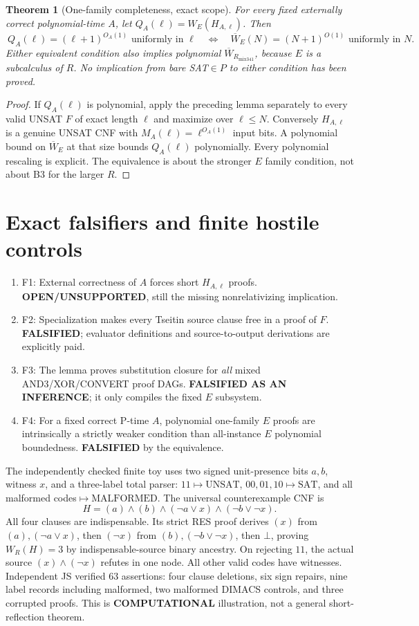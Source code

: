 \documentclass[11pt]{article}
\newtheorem{theorem}{Theorem}
\begin{document}
\begin{theorem}[One-family completeness, exact scope]
For \emph{every fixed externally correct polynomial-time} $A$, let $Q_A(\ell)=W_E(H_{A,\ell})$. Then
\[
\boxed{\ Q_A(\ell)=(\ell+1)^{O_A(1)}\text{ uniformly in }\ell
\quad\Longleftrightarrow\quad
\overline W_E(N)=(N+1)^{O(1)}\text{ uniformly in }N.\ }
\]
Either equivalent condition also implies polynomial $\overline W_{R_{\mathrm{mix341}}}$, because $E$ is a subcalculus of $R$. No implication from bare SAT$\in P$ to either condition has been proved.
\end{theorem}
\begin{proof}
If $Q_A(\ell)$ is polynomial, apply the preceding lemma separately to every valid UNSAT $F$ of exact length $\ell$ and maximize over $\ell\le N$. Conversely $H_{A,\ell}$ is a genuine UNSAT CNF with $M_A(\ell)=\ell^{O_A(1)}$ input bits. A polynomial bound on $\overline W_E$ at that size bounds $Q_A(\ell)$ polynomially. Every polynomial rescaling is explicit. The equivalence is about the stronger $E$ family condition, not about B3 for the larger $R$.
\end{proof}

\section*{Exact falsifiers and finite hostile controls}
\begin{enumerate}
\item[] F1: External correctness of $A$ forces short $H_{A,\ell}$ proofs. \textbf{OPEN/UNSUPPORTED}, still the missing nonrelativizing implication.
\item[] F2: Specialization makes every Tseitin source clause free in a proof of $F$. \textbf{FALSIFIED}; evaluator definitions and source-to-output derivations are explicitly paid.
\item[] F3: The lemma proves substitution closure for \emph{all} mixed AND3/XOR/CONVERT proof DAGs. \textbf{FALSIFIED AS AN INFERENCE}; it only compiles the fixed $E$ subsystem.
\item[] F4: For a fixed correct P-time $A$, polynomial one-family $E$ proofs are intrinsically a strictly weaker condition than all-instance $E$ polynomial boundedness. \textbf{FALSIFIED} by the equivalence.
\end{enumerate}
The independently checked finite toy uses two signed unit-presence bits $a,b$, witness $x$, and a three-label total parser: $11\mapsto\mathrm{UNSAT}$, $00,01,10\mapsto\mathrm{SAT}$, and all malformed codes$\mapsto\mathrm{MALFORMED}$. The universal counterexample CNF is
\[
H=(a)\land(b)\land(\neg a\vee x)\land(\neg b\vee\neg x).
\]
All four clauses are indispensable. Its strict RES proof derives $(x)$ from $(a),(\neg a\vee x)$, then $(\neg x)$ from $(b),(\neg b\vee\neg x)$, then $\bot$, proving $W_R(H)=3$ by indispensable-source binary ancestry. On rejecting $11$, the actual source $(x)\land(\neg x)$ refutes in one node. All other valid codes have witnesses. Independent JS verified 63 assertions: four clause deletions, six sign repairs, nine label records including malformed, two malformed DIMACS controls, and three corrupted proofs. This is \textbf{COMPUTATIONAL} illustration, not a general short-reflection theorem.
\end{document}
